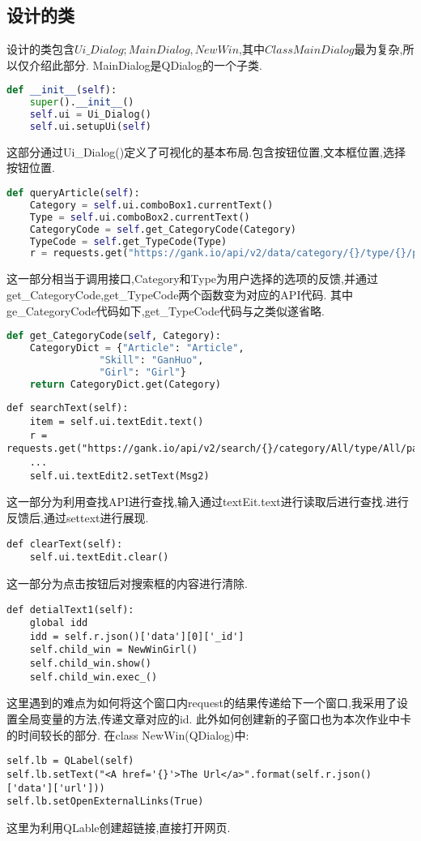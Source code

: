\documentclass[12pt,a4paper,UTF8]{ctexart}
\begin{document}
    \subsection{设计的类}
    设计的类包含$Ui\_Dialog;MainDialog,NewWin$,其中$Class MainDialog$最为复杂,所以仅介绍此部分.
MainDialog是QDialog的一个子类.
\begin{lstlisting}[language={python}]
def __init__(self):
    super().__init__()
    self.ui = Ui_Dialog()
    self.ui.setupUi(self)
\end{lstlisting}
这部分通过Ui\_Dialog()定义了可视化的基本布局.包含按钮位置,文本框位置,选择按钮位置.
\begin{lstlisting}[language={python}]
def queryArticle(self):
    Category = self.ui.comboBox1.currentText()
    Type = self.ui.comboBox2.currentText()
    CategoryCode = self.get_CategoryCode(Category)
    TypeCode = self.get_TypeCode(Type)
    r = requests.get("https://gank.io/api/v2/data/category/{}/type/{}/page/1/count/10".format(CategoryCode,TypeCode))
\end{lstlisting}
这一部分相当于调用接口,Category和Type为用户选择的选项的反馈,并通过get\_CategoryCode,get\_TypeCode两个函数变为对应的API代码.
其中ge\_CategoryCode代码如下,get\_TypeCode代码与之类似遂省略.
\begin{lstlisting}[language={python}]
def get_CategoryCode(self, Category):
    CategoryDict = {"Article": "Article",
                "Skill": "GanHuo",
                "Girl": "Girl"}  
    return CategoryDict.get(Category)
\end{lstlisting}
\begin{lstlisting}
def searchText(self):
    item = self.ui.textEdit.text()
    r = requests.get("https://gank.io/api/v2/search/{}/category/All/type/All/page/1/count/10".format(item))
    ...
    self.ui.textEdit2.setText(Msg2)
\end{lstlisting}
这一部分为利用查找API进行查找,输入通过textEit.text进行读取后进行查找.进行反馈后,通过settext进行展现.
\begin{lstlisting}
def clearText(self):
    self.ui.textEdit.clear()
\end{lstlisting}
这一部分为点击按钮后对搜索框的内容进行清除.
\begin{lstlisting}
def detialText1(self):
    global idd
    idd = self.r.json()['data'][0]['_id']
    self.child_win = NewWinGirl()
    self.child_win.show()
    self.child_win.exec_()
\end{lstlisting}
这里遇到的难点为如何将这个窗口内request的结果传递给下一个窗口,我采用了设置全局变量的方法,传递文章对应的id.
此外如何创建新的子窗口也为本次作业中卡的时间较长的部分.
在class NewWin(QDialog)中:
\begin{lstlisting}
self.lb = QLabel(self)
self.lb.setText("<A href='{}'>The Url</a>".format(self.r.json()['data']['url']))
self.lb.setOpenExternalLinks(True)
\end{lstlisting}
这里为利用QLable创建超链接,直接打开网页.
\end{document}
